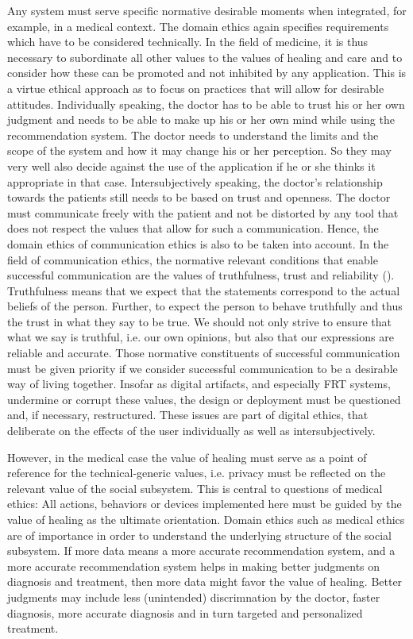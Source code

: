 \documentclass[manuscript,screen]{acmart}
\begin{document}
Any system must serve specific normative desirable moments when integrated, for example, in a medical context. The domain ethics again specifies requirements which have to be considered technically. In the field of medicine, it is thus necessary to subordinate all other values to the values of healing and care and to consider how these can be promoted and not inhibited by any application. This is a virtue ethical approach as to focus on practices that will allow for desirable attitudes. Individually speaking, the doctor has to be able to trust his or her own judgment and needs to be able to make up his or her own mind while using the recommendation system. The doctor needs to understand the limits and the scope of the system and how it may change his or her perception. So they may very well also decide against the use of the application if he or she thinks it appropriate in that case. Intersubjectively speaking, the doctor’s  relationship towards the patients still needs to be based on trust and openness. The doctor must communicate freely with the patient and not be distorted by any tool that does not respect the values that allow for such a communication. Hence, the domain ethics of communication ethics is also to be taken into account. In the field of communication ethics, the normative relevant conditions that enable successful communication are the values of truthfulness, trust and reliability (\citep[p. 59-68]{nida2011optimierungsfalle}). Truthfulness means that we expect that the statements correspond to the actual beliefs of the person. Further, to expect the person to behave truthfully and thus the trust in what they say to be true. We should not only strive to ensure that what we say is truthful, i.e. our own opinions, but also that our expressions are reliable and accurate. Those normative constituents of successful communication must be given priority if we consider successful communication to be a desirable way of living together. Insofar as digital artifacts, and especially FRT systems, undermine or corrupt these values, the design or deployment must be questioned and, if necessary, restructured. These issues are part of digital ethics, that deliberate on the effects of the user individually as well as intersubjectively.

However, in the medical case the value of healing must serve as a point of reference for the technical-generic values, i.e. privacy must be reflected on the relevant value of the social subsystem. This is central to questions of medical ethics: All actions, behaviors or devices implemented here must be guided by the value of healing as the ultimate orientation. Domain ethics such as medical ethics are of importance in order to understand the underlying structure of the social subsystem. If more data means a more accurate recommendation system, and a more accurate recommendation system helps in making better judgments on diagnosis and treatment, then more data might favor the value of healing. Better judgments may include less (unintended) discrimnation by the doctor, faster diagnosis, more accurate diagnosis and in turn targeted and personalized treatment. 
\end{document}
